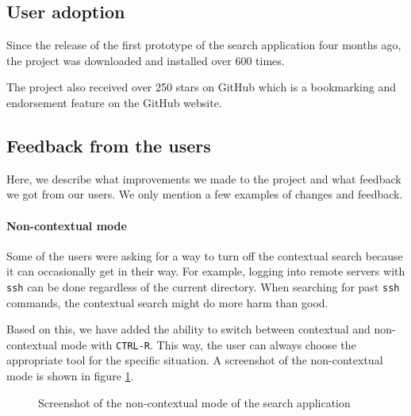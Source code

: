 \subsection{User adoption}

Since the release of the first prototype of the search application four months ago, the project was downloaded and installed over 600 times. 

The project also received over 250 stars on GitHub which is a bookmarking and endorsement feature on the GitHub website.\cite{github-stars}\cite{resh-github-homepage}


\subsection{Feedback from the users}

Here, we describe what improvements we made to the project and what feedback we got from our users. We only mention a few examples of changes and feedback.

\paragraph{Non-contextual mode}

Some of the users were asking for a way to turn off the contextual search because it can occasionally get in their way. For example, logging into remote servers with \verb|ssh| can be done regardless of the current directory. When searching for past \verb|ssh| commands, the contextual search might do more harm than good.

Based on this, we have added the ability to switch between contextual and non-contextual mode with \verb|CTRL-R|. This way, the user can always choose the appropriate tool for the specific situation. A screenshot of the non-contextual mode is shown in figure \ref{xterm-resh-raw-80}.

\begin{figure}
\caption{Screenshot of the non-contextual mode of the search application}
\label{xterm-resh-raw-80}
\end{figure}

